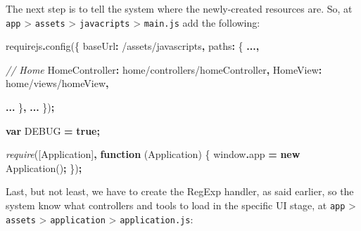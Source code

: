 \documentclass[
  11pt,
]{krantz}
\newenvironment{Shaded}{\begin{snugshade}}{\end{snugshade}}
\newcommand{\AttributeTok}[1]{\textcolor[rgb]{0.61,0.61,0.61}{#1}}
\newcommand{\BuiltInTok}[1]{#1}
\newcommand{\CommentTok}[1]{\textcolor[rgb]{0.37,0.37,0.37}{\textit{#1}}}
\newcommand{\DataTypeTok}[1]{\textcolor[rgb]{0.27,0.27,0.27}{#1}}
\newcommand{\FunctionTok}[1]{\textcolor[rgb]{0,0,0}{#1}}
\newcommand{\KeywordTok}[1]{\textcolor[rgb]{0.27,0.27,0.27}{\textbf{#1}}}
\newcommand{\NormalTok}[1]{#1}
\newcommand{\OperatorTok}[1]{\textcolor[rgb]{0.43,0.43,0.43}{\textbf{#1}}}
\newcommand{\PreprocessorTok}[1]{\textcolor[rgb]{0.37,0.37,0.37}{\textit{#1}}}
\newcommand{\StringTok}[1]{\textcolor[rgb]{0.5,0.5,0.5}{#1}}
\begin{document}
The next step is to tell the system where the newly-created resources are. So, at \texttt{app} \textgreater{} \texttt{assets} \textgreater{} \texttt{javacripts} \textgreater{} \texttt{main.js} add the following:

\begin{Shaded}
\begin{Highlighting}[]
\NormalTok{requirejs}\OperatorTok{.}\FunctionTok{config}\NormalTok{(\{}
    \DataTypeTok{baseUrl}\OperatorTok{:} \StringTok{\textquotesingle{}/assets/javascripts\textquotesingle{}}\OperatorTok{,}
    \DataTypeTok{paths}\OperatorTok{:}\NormalTok{ \{}
        \OperatorTok{...,}

        \CommentTok{// Home}
    \StringTok{\textquotesingle{}HomeController\textquotesingle{}}\OperatorTok{:} \StringTok{\textquotesingle{}home/controllers/homeController\textquotesingle{}}\OperatorTok{,}
    \StringTok{\textquotesingle{}HomeView\textquotesingle{}}\OperatorTok{:} \StringTok{\textquotesingle{}home/views/homeView\textquotesingle{}}\OperatorTok{,}

        \OperatorTok{...}
\NormalTok{    \}}\OperatorTok{,}
    \OperatorTok{...}
\NormalTok{\})}\OperatorTok{;}

\KeywordTok{var}\NormalTok{ DEBUG }\OperatorTok{=} \KeywordTok{true}\OperatorTok{;}

\PreprocessorTok{require}\NormalTok{([}\StringTok{\textquotesingle{}Application\textquotesingle{}}\NormalTok{]}\OperatorTok{,} \KeywordTok{function}\NormalTok{ (Application) \{}
    \BuiltInTok{window}\OperatorTok{.}\AttributeTok{app} \OperatorTok{=} \KeywordTok{new} \FunctionTok{Application}\NormalTok{()}\OperatorTok{;}
\NormalTok{\})}\OperatorTok{;}
\end{Highlighting}
\end{Shaded}

Last, but not least, we have to create the RegExp handler, as said earlier, so the system know what controllers and tools to load in the specific UI stage, at \texttt{app} \textgreater{} \texttt{assets} \textgreater{} \texttt{application} \textgreater{} \texttt{application.js}:
\end{document}

